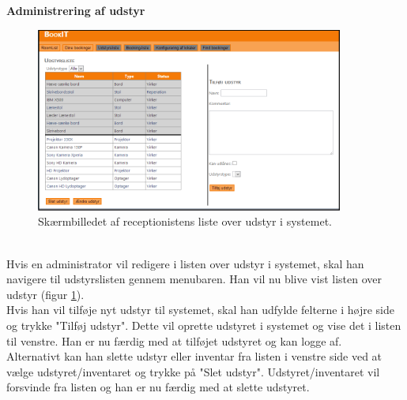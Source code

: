 \textbf{Administrering af udstyr}
\begin{figure}[h!]
  \centering
    \includegraphics[width=0.9\textwidth]{Appendix/GUI-Prototype/DigitalMockup/UdstyrsListe}
  \caption{Skærmbilledet af receptionistens liste over udstyr i systemet.}
\label{Design_G_Development_UdstyrsListe_Final}
\end{figure} 
\\Hvis en administrator vil redigere i listen over udstyr i systemet, skal han navigere til udstyrslisten gennem menubaren. Han vil nu blive vist listen over udstyr (figur \ref{Design_G_Development_UdstyrsListe_Final}). 
\\Hvis han vil tilføje nyt udstyr til systemet, skal han udfylde felterne i højre side og trykke "Tilføj udstyr". Dette vil oprette udstyret i systemet og vise det i listen til venstre. Han er nu færdig med at tilføjet udstyret og kan logge af.
\\Alternativt kan han slette udstyr eller inventar fra listen i venstre side ved at vælge udstyret/inventaret og trykke på "Slet udstyr". Udstyret/inventaret vil forsvinde fra listen og han er nu færdig med at slette udstyret.

